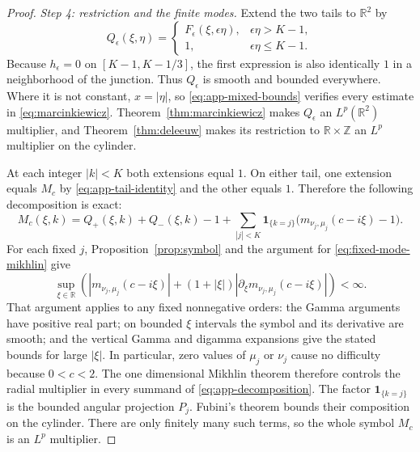 \documentclass[11pt,a4paper,reqno,backref=page]{amsart}
\newcommand{\R}{\mathbb R}
\newcommand{\Z}{\mathbb Z}
\newcommand{\ind}{\mathbf 1}
\numberwithin{equation}{section}
\theoremstyle{definition}
\theoremstyle{remark}
\begin{document}
\begin{proof}
  \emph{Step 4: restriction and the finite modes.}
  Extend the two tails to $\R^2$ by
  \begin{equation}\label{eq:app-extension}
    Q_\epsilon(\xi,\eta)=
    \begin{cases}
      F_\epsilon(\xi,\epsilon\eta),
        &\epsilon\eta>K-1,\\
      1,&\epsilon\eta\le K-1.
    \end{cases}
  \end{equation}
  Because $h_\epsilon=0$ on $[K-1,K-1/3]$, the first
  expression is also identically $1$ in a neighborhood of
  the junction. Thus $Q_\epsilon$ is smooth and bounded
  everywhere. Where it is not constant, $x=|\eta|$, so
  \eqref{eq:app-mixed-bounds} verifies every estimate in
  \eqref{eq:marcinkiewicz}. Theorem~\ref{thm:marcinkiewicz}
  makes $Q_\epsilon$ an $L^p(\R^2)$ multiplier, and
  Theorem~\ref{thm:deleeuw} makes its restriction to
  $\R\times\Z$ an $L^p$ multiplier on the cylinder.

  At each integer $|k|<K$ both extensions equal $1$.
  On either tail, one extension equals $M_c$ by
  \eqref{eq:app-tail-identity} and the other equals $1$.
  Therefore the following decomposition is exact:
  \begin{equation}\label{eq:app-decomposition}
    M_c(\xi,k)
      =Q_+(\xi,k)+Q_-(\xi,k)-1 +\sum_{|j|<K}\ind_{\{k=j\}}
        \bigl(m_{\nu_j,\mu_j}(c-i\xi)-1\bigr).
  \end{equation}
  For each fixed $j$, Proposition~\ref{prop:symbol} and
  the argument for \eqref{eq:fixed-mode-mikhlin} give
  \begin{equation*}
    \sup_{\xi\in\R}\left(
      |m_{\nu_j,\mu_j}(c-i\xi)|
      +(1+|\xi|)
      |\partial_\xi m_{\nu_j,\mu_j}(c-i\xi)|
    \right)<\infty.
  \end{equation*}
  That argument applies to any fixed nonnegative orders:
  the Gamma arguments have positive real part; on bounded
  $\xi$ intervals the symbol and its derivative are smooth;
  and the vertical Gamma and digamma expansions give the
  stated bounds for large $|\xi|$. In particular, zero
  values of $\mu_j$ or $\nu_j$ cause no difficulty because
  $0<c<2$. The one dimensional Mikhlin theorem therefore
  controls the radial multiplier in every summand of
  \eqref{eq:app-decomposition}. The factor
  $\ind_{\{k=j\}}$ is the bounded angular projection $P_j$.
  Fubini's theorem bounds their composition on the cylinder.
  There are only finitely many such terms, so the whole
  symbol $M_c$ is an $L^p$ multiplier.


\end{proof}
\end{document}
